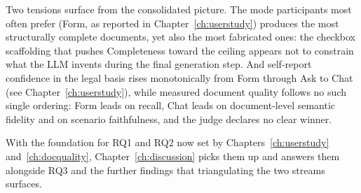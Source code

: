 Two tensions surface from the consolidated picture. The mode
participants most often prefer (Form, as reported in
Chapter~\ref{ch:userstudy}) produces the most structurally
complete documents, yet also the most fabricated ones: the
checkbox scaffolding that pushes Completeness toward the ceiling
appears not to constrain what the LLM invents during the final
generation step. And self-report confidence in the legal basis
rises monotonically from Form through Ask to Chat (see
Chapter~\ref{ch:userstudy}), while measured document quality
follows no such single ordering: Form leads on recall, Chat leads
on document-level semantic fidelity and on scenario faithfulness,
and the judge declares no clear winner.

With the foundation for RQ1 and RQ2 now set by
Chapters~\ref{ch:userstudy} and~\ref{ch:docquality},
Chapter~\ref{ch:discussion} picks them up and answers them
alongside RQ3 and the further findings that triangulating the
two streams surfaces.